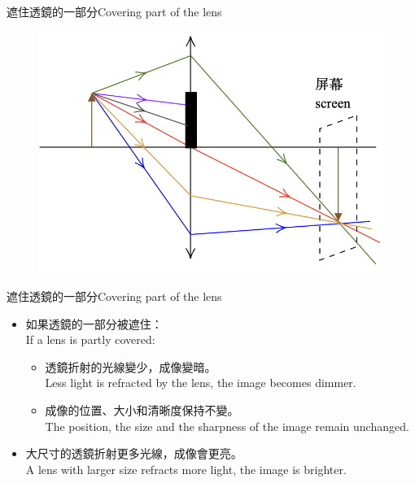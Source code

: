 \documentclass[beamer=true]{standalone}
\begin{document}
\begin{frame}{遮住透鏡的一部分Covering part of the lens}
    \begin{figure}
        \centering
        \includegraphics[width=0.75\linewidth]{assets/nud982u98u.png}


    \end{figure}
\end{frame}
\begin{frame}{遮住透鏡的一部分Covering part of the lens}
    \begin{itemize}
        \item 如果透鏡的一部分被遮住：\\If a lens is partly covered:
              \begin{itemize}
                  \item 透鏡折射的光線變少，成像變暗。\\Less light is refracted by the lens, the image becomes dimmer.
                  \item 成像的位置、大小和清晰度保持不變。\\The position, the size and the sharpness of the image remain unchanged.
              \end{itemize}
        \item 大尺寸的透鏡折射更多光線，成像會更亮。\\A lens with larger size refracts more light, the image is brighter.
    \end{itemize}
\end{frame}
\end{document}
